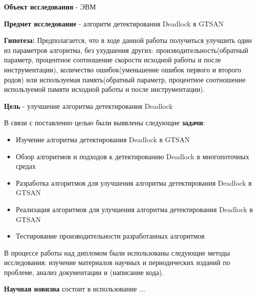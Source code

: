 \textbf{Объект исследования} - ЭВМ

\textbf{Предмет исследование} - алгоритм детектирования Deadlock в GTSAN

\textbf{Гипотеза:} Предполагается, что в ходе данной работы получиться улучшить один из параметров алгоритма, без ухудшения других: производительность(обратный параметр, процентное соотношение скорости исходной работы и после инструментации), количество ошибок(уменьшение ошибок первого и второго родов) или используемая память(обратный параметр, процентное соотношение используемой памяти исходной работы и после инструментации).

\textbf{Цель} - улучшение алгоритма детектирования Deadlock

В связи с поставленно целью были выявлены следующие \textbf{задачи}:

\begin{itemize}  
\item Изучение алгоритма детектирования Deadlock в GTSAN
\item Обзор алгоритмов и подходов к детектированию Deadlock в многопоточных средах
\item Разработка алгоритмов для улучшения алгоритма детектирования Deadlock в GTSAN
\item Реализация алгоритмов для улучшения алгоритма детектирования Deadlock в GTSAN
\item Тестирование производительности разработанных алгоритмов
\end{itemize}

В процессе работы над дипломом были использованы следующие методы исследования: изучение материалов научных и периодических изданий по проблеме, анализ документации и (написание кода).

\textbf{Научная новизна} состоит в использование ...

\clearpage